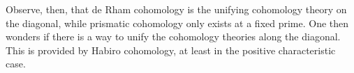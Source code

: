 Observe, then, that de Rham cohomology is the unifying cohomology theory on the diagonal, while prismatic cohomology only exists at a fixed prime. One then wonders if there is a way to unify the cohomology theories along the diagonal. This is provided by Habiro cohomology, at least in the positive characteristic case.
\begin{figure}[H]\label{fig: Habiro cohomology}
    \begin{center}

        \begin{tikzpicture}[x=0.75pt,y=0.75pt,yscale=-1,xscale=1]


\end{tikzpicture}
\end{center}
\end{figure}
